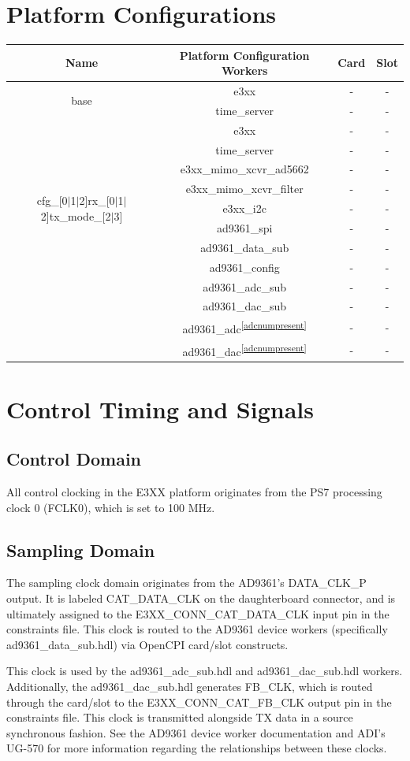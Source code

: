\documentclass{article}
\def\comp{e3xx}
\begin{document}
\section*{Platform Configurations}
	\begin{tabular}{|c|c|c|c|}
		\hline
		\rowcolor{blue}
		Name & Platform Configuration Workers & Card & Slot \\
		\hline
		\multirow{2}{*}{base} &\comp & - & - \\ &time\_server & - & - \\
		\hline
		\multirow{9}{*}{cfg\_[0$|$1$|$2]rx\_[0$|$1$|$2]tx\_mode\_[2$|$3]} &\comp & - & - \\ &time\_server & - & - \\ &e3xx\_mimo\_xcvr\_ad5662& - & - \\ &e3xx\_mimo\_xcvr\_filter & - & - \\ &e3xx\_i2c & - & - \\ &ad9361\_spi & - & - \\ &ad9361\_data\_sub & - & - \\ &ad9361\_config & - & - \\ &ad9361\_adc\_sub & - & - \\ &ad9361\_dac\_sub & - & - \\ &ad9361\_adc\textsuperscript{\ref{adcnumpresent}} & - & - \\ &ad9361\_dac\textsuperscript{\ref{adcnumpresent}} & - & - \\
		\hline
	\end{tabular}
\section*{Control Timing and Signals}
\subsection*{Control Domain}
All control clocking in the E3XX platform originates from the PS7 processing clock 0 (FCLK0), which is set to 100 MHz.

\subsection*{Sampling Domain}
The sampling clock domain originates from the AD9361's DATA\_CLK\_P output. It is labeled CAT\_DATA\_CLK on the daughterboard connector, and is ultimately assigned to the E3XX\_CONN\_CAT\_DATA\_CLK input pin in the constraints file. This clock is routed to the AD9361 device workers (specifically ad9361\_data\_sub.hdl) via OpenCPI card/slot constructs.\par\medskip
\noindent This clock is used by the ad9361\_adc\_sub.hdl and ad9361\_dac\_sub.hdl workers. Additionally, the ad9361\_dac\_sub.hdl generates FB\_CLK, which is routed through the card/slot to the E3XX\_CONN\_CAT\_FB\_CLK output pin in the constraints file. This clock is transmitted alongside TX data in a source synchronous fashion. See the AD9361 device worker documentation and ADI's UG-570 for more information regarding the relationships between these clocks.
\end{document}
